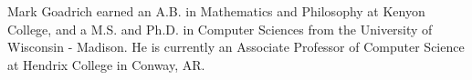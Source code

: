 \documentclass[journal]{IEEEtran}
\begin{document}






\ifCLASSOPTIONcaptionsoff
  \newpage
\fi







%
% 

\begin{IEEEbiography}{Mark Goadrich} earned an A.B. in Mathematics and Philosophy at Kenyon College, and a M.S. and Ph.D. in Computer Sciences from the University of Wisconsin - Madison.
He is currently an Associate Professor of Computer Science at Hendrix College in Conway, AR.
\end{IEEEbiography}
\end{document}

